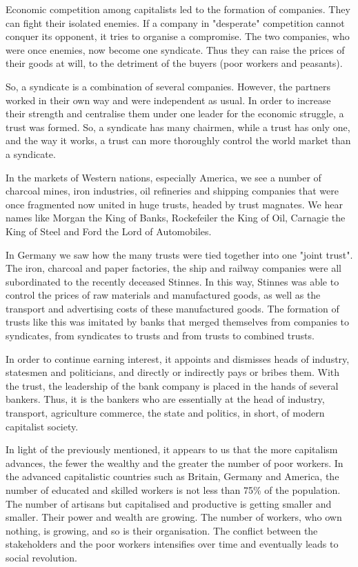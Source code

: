 Economic competition among capitalists led to the formation of companies. 
They can fight their isolated enemies. If a company in "desperate" competition cannot conquer its opponent, 
it tries to organise a compromise. The two companies, who were once enemies, now become one syndicate. 
Thus they can raise the prices of their goods at will, to the detriment of the buyers (poor workers and peasants).\nline

So, a syndicate is a combination of several companies. However, the partners worked 
in their own way and were independent as usual. In order to increase their strength and 
centralise them under one leader for the economic struggle, a trust was formed. So, a 
syndicate has many chairmen, while a trust has only one, and the way it works, a trust 
can more thoroughly control the world market than a syndicate.\nline

In the markets of Western nations, especially America, we see a number of charcoal mines, 
iron industries, oil refineries and shipping companies that were once fragmented now united 
in huge trusts, headed by trust magnates. We hear names like Morgan the King of Banks, 
Rockefeiler the King of Oil, Carnagie the King of Steel and Ford the Lord of Automobiles.\nline

In Germany we saw how the many trusts were tied together into one "joint trust". 
The iron, charcoal and paper factories, the ship and railway companies were all 
subordinated to the recently deceased Stinnes. In this way, Stinnes was able to control 
the prices of raw materials and manufactured goods, as well as the transport and advertising 
costs of these manufactured goods. The formation of trusts like this was imitated by 
banks that merged themselves from companies to syndicates, from syndicates to trusts and from trusts to combined trusts.\nline

In order to continue earning interest, it appoints and dismisses heads of industry, statesmen and 
politicians, and directly or indirectly pays or bribes them. With the trust, the leadership of 
the bank company is placed in the hands of several bankers. Thus, it is the bankers who are essentially 
at the head of industry, transport, agriculture commerce, the state and politics, in short, of modern capitalist society.\nline

In light of the previously mentioned, it appears to us that the more capitalism advances, the fewer 
the wealthy and the greater the number of poor workers. In the advanced capitalistic countries such 
as Britain, Germany and America, the number of educated and skilled workers is not less than 
75\% of the population. The number of artisans but capitalised and productive is getting smaller 
and smaller. Their power and wealth are growing. The number of workers, who own nothing, is growing, 
and so is their organisation. The conflict between the stakeholders and the poor workers intensifies 
over time and eventually leads to social revolution.\nline

